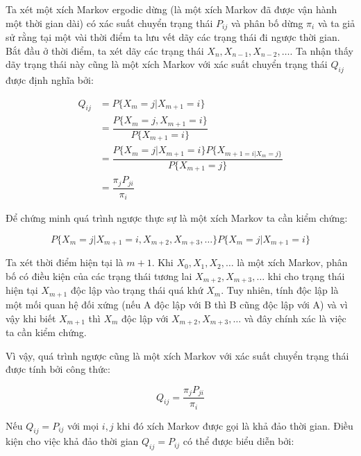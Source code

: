 \documentclass[14pt, a4paper]{article}
\numberwithin{equation}{section}
\numberwithin{figure}{section}
\theoremstyle{sltheorem}
\theoremstyle{soltheorem}
\numberwithin{dl}{section}
\numberwithin{md}{section}
\numberwithin{vd}{section}
\begin{document}
    Ta xét một xích Markov ergodic dừng (là một xích Markov đã được vận hành một thời gian dài) có xác suất chuyển trạng thái $P_{ij}$ và phân bố dừng $\pi_i$ và ta giả sử rằng tại một vài thời điểm ta lưu vết dãy các trạng thái đi ngược thời gian.
    Bắt đầu ở thời điểm, ta xét dãy các trạng thái $X_n, X_{n-1}, X_{n-2}, \dots$.
    Ta nhận thấy dãy trạng thái này cũng là một xích Markov với xác suất chuyển trạng thái $Q_{ij}$ được định nghĩa bởi:

    \begin{equation*}
        \begin{aligned}
            Q_{ij} &= P \lbrace X_m = j \vert X_{m+1} = i \rbrace \\
            &= \dfrac{P \lbrace X_m = j, X_{m+1}=i \rbrace}{P \lbrace X_{m+1}=i \rbrace} \\
            &= \dfrac{P \lbrace X_m = j \vert X_{m+1} = i \rbrace P \lbrace X_{m+1=i \vert X_m = j \rbrace}}{P \lbrace X_{m+1}=j \rbrace} \\
            &= \dfrac{\pi_j P_{ji}}{\pi_i}
        \end{aligned}
    \end{equation*}

    Để chứng minh quá trình ngược thực sự là một xích Markov ta cần kiểm chứng:

    \begin{equation*}
        P \lbrace X_m = j \vert X_{m+1}=i, X_{m+2}, X_{m+3}, \dots \rbrace P \lbrace X_m = j \vert X_{m+1}=i \rbrace
    \end{equation*}

    Ta xét thời điểm hiện tại là $m+1$. Khi $X_0, X_1, X_2, \dots$ là một xích Markov, phân bố có điều kiện của các trạng thái tương lai $X_{m+2}, X_{m+3}, \dots$ khi cho trạng thái hiện tại $X_{m+1}$ độc lập vào trạng thái quá khứ $X_m$.
    Tuy nhiên, tính độc lập là một mối quan hệ đối xứng (nếu A độc lập với B thì B cũng độc lập với A) và vì vậy khi biết $X_{m+1}$ thì $X_m$ độc lập với $X_{m+2}, X_{m+3}, \dots$ và đây chính xác là việc ta cần kiểm chứng.

    Vì vậy, quá trình ngược cũng là một xích Markov với xác suất chuyển trạng thái được tính bởi công thức:

    \begin{equation*}
        Q_{ij} = \dfrac{\pi_j P_{ji}}{\pi_i}
    \end{equation*}

    Nếu $Q_{ij} = P_{ij}$ với mọi $i, j$ khi đó xích Markov được gọi là khả đảo thời gian.
    Điều kiện cho việc khả đảo thời gian $Q_{ij}=P_{ij}$ có thể được biểu diễn bởi:
\end{document}
